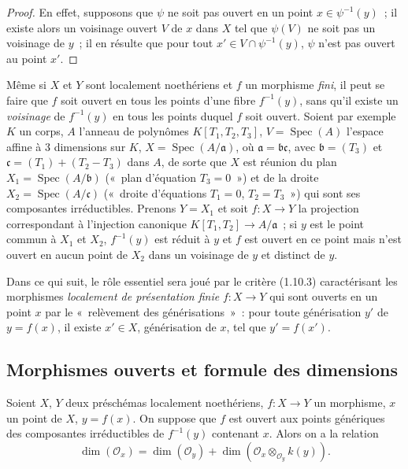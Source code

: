 \begin{proof}
En effet, supposons que $\psi$ ne soit pas ouvert en un point
$x\in\psi^{-1}(y)$~; il existe alors un voisinage ouvert $V$ de $x$ dans $X$ tel
que $\psi(V)$ ne soit pas un voisinage de $y$~; il en résulte que pour tout
$x'\in V\cap\psi^{-1}(y)$, $\psi$ n'est pas ouvert au point $x'$.
\end{proof}

\begin{remark}[14.1.5]
\label{IV.14.1.5-fr}
Même si $X$ et $Y$ sont localement noethériens et $f$ un morphisme \emph{fini},
il peut se faire que $f$ soit ouvert en tous les points d'une fibre $f^{-1}(y)$,
sans qu'il existe un \emph{voisinage} de $f^{-1}(y)$ en tous les points duquel $f$
soit ouvert. Soient par exemple $K$ un corps, $A$ l'anneau de polynômes
$K[T_1,T_2,T_3]$, $V=\operatorname{Spec}(A)$ l'espace affine à 3 dimensions sur
$K$, $X=\operatorname{Spec}(A/\mathfrak a)$, où $\mathfrak a=\mathfrak b\mathfrak c$,
avec $\mathfrak b=(T_3)$ et $\mathfrak c=(T_1)+(T_2-T_3)$ dans $A$, de sorte que
$X$ est réunion du plan $X_1=\operatorname{Spec}(A/\mathfrak b)$ («~plan
d'équation $T_3=0$~») et de la droite $X_2=\operatorname{Spec}(A/\mathfrak c)$
(«~droite d'équations $T_1=0$, $T_2=T_3$~») qui sont ses composantes
irréductibles. Prenons $Y=X_1$ et soit $f:X\to Y$ la projection correspondant à
l'injection canonique $K[T_1,T_2]\to A/\mathfrak a$~; si $y$ est le point commun
à $X_1$ et $X_2$, $f^{-1}(y)$ est réduit à $y$ et $f$ est ouvert en ce point mais
n'est ouvert en aucun point de $X_2$ dans un voisinage de $y$ et distinct de $y$.
\end{remark}

\begin{env}[14.1.6]
\label{IV.14.1.6-fr}
Dans ce qui suit, le rôle essentiel sera joué par le critère (1.10.3)
caractérisant les morphismes \emph{localement de présentation finie} $f:X\to Y$
qui sont ouverts en un point $x$ par le «~relèvement des générisations~»~: pour
toute générisation $y'$ de $y=f(x)$, il existe $x'\in X$, générisation de $x$, tel
que $y'=f(x')$.
\end{env}

\subsection{Morphismes ouverts et formule des dimensions}
\label{subsection:IV.14.2-fr}

\begin{theorem}[14.2.1]
Soient $X$, $Y$ deux préschémas localement noethériens, $f:X\to Y$ un morphisme,
$x$ un point de $X$, $y=f(x)$. On suppose que $f$ est ouvert aux points génériques
des composantes irréductibles de $f^{-1}(y)$ contenant $x$. Alors on a la relation
\begin{equation}
\tag{14.2.1.1}
\label{IV.14.2.1.1-fr}
  \dim(\mathcal O_x)=\dim(\mathcal O_y)+
  \dim(\mathcal O_x\otimes_{\mathcal O_y}k(y)).
\end{equation}
\end{theorem}

